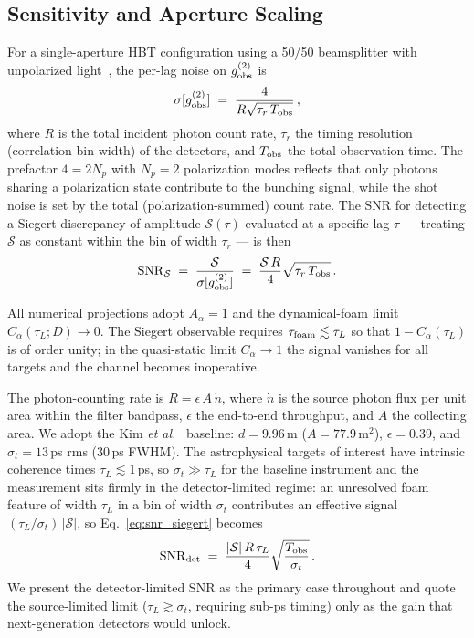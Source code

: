 \documentclass[aps,prd,onecolumn,amsmath,amssymb]{revtex4-2}
\begin{document}
\subsection{Sensitivity and Aperture Scaling}

For a single-aperture HBT configuration using a 50/50 beamsplitter with
unpolarized light~\cite{Guerin2025}, the per-lag noise on $g^{(2)}_{\rm obs}$ is
\begin{equation}
  \sigma[g^{(2)}_{\rm obs}]
  \;=\; \frac{4}{R\sqrt{\tau_r\,T_{\rm obs}}}\,,
  \label{eq:g2noise}
\end{equation}
where $R$ is the total incident photon count rate, $\tau_r$ the timing resolution
(correlation bin width) of the detectors, and $T_{\rm obs}$ the total observation
time.
The prefactor $4 = 2N_p$ with $N_p=2$ polarization modes reflects that only
photons sharing a polarization state contribute to the bunching signal, while
the shot noise is set by the total (polarization-summed) count rate.
The SNR for detecting a Siegert discrepancy of amplitude $\mathcal{S}(\tau)$
evaluated at a specific lag $\tau$ --- treating $\mathcal{S}$ as constant
within the bin of width $\tau_r$ --- is then
\begin{equation}
  \mathrm{SNR}_{\mathcal{S}}
  \;=\; \frac{\mathcal{S}}{\sigma[g^{(2)}_{\rm obs}]}
  \;=\; \frac{\mathcal{S}\,R}{4}\sqrt{\tau_r\,T_{\rm obs}}\,.
  \label{eq:snr_siegert}
\end{equation}

All numerical projections adopt $A_\alpha = 1$ and the dynamical-foam limit
$C_\alpha(\tau_L; D) \to 0$.  The Siegert observable requires
$\tau_{\rm foam}\lesssim\tau_L$ so that $1-C_\alpha(\tau_L)$ is of order
unity; in the quasi-static limit $C_\alpha\to 1$ the signal vanishes for
all targets and the channel becomes inoperative.

The photon-counting rate is $R = \epsilon\, A\, \dot{n}$, where $\dot{n}$ is the
source photon flux per unit area within the filter bandpass, $\epsilon$ the
end-to-end throughput, and $A$ the collecting area. We adopt the Kim
\emph{et al.}~\cite{Kim2025} baseline: $d = 9.96$\,m
($A = 77.9$\,m$^2$), $\epsilon = 0.39$, and $\sigma_t = 13$\,ps rms
(30\,ps FWHM).
The astrophysical targets of interest have intrinsic coherence times
$\tau_L \lesssim 1$\,ps, so $\sigma_t \gg \tau_L$ for the baseline instrument and
the measurement sits firmly in the detector-limited regime: an unresolved
foam feature of width $\tau_L$ in a bin of width $\sigma_t$ contributes an
effective signal $(\tau_L/\sigma_t)\,|\mathcal{S}|$, so
Eq.~\eqref{eq:snr_siegert} becomes
\begin{equation}
  \mathrm{SNR}_{\rm det}
  \;=\; \frac{|\mathcal{S}|\,R\,\tau_L}{4}\sqrt{\frac{T_{\rm obs}}{\sigma_t}}\,.
  \label{eq:snr_det}
\end{equation}
We present the detector-limited SNR as the primary case throughout and quote
the source-limited limit ($\tau_L \gtrsim \sigma_t$, requiring sub-ps timing)
only as the gain that next-generation detectors would unlock.
\end{document}
